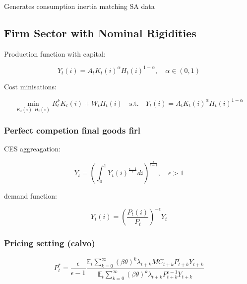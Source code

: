 \documentclass[11pt,preprint]{elsarticle}
\numberwithin{equation}{section}
\numberwithin{figure}{section}
\numberwithin{table}{section}
\begin{document}
Generates consumption inertia matching SA data

\subsection{Firm Sector with Nominal
Rigidities}\label{firm-sector-with-nominal-rigidities}

Production function with capital:

\begin{equation}
Y_t(i) = A_t K_t(i)^{\alpha} H_t(i)^{1-\alpha}, \quad \alpha \in (0,1)
\label{production}
\end{equation}

Cost minisations:

\begin{equation}
\min_{K_t(i), H_t(i)} R_t^k K_t(i) + W_t H_t(i) \quad \text{s.t.} \quad Y_t(i) = A_t K_t(i)^{\alpha} H_t(i)^{1-\alpha}
\end{equation}

\subsubsection{Perfect competion final goods
firl}\label{perfect-competion-final-goods-firl}

CES aggreagation:

\begin{equation}
Y_t = \left( \int_0^1 Y_t(i)^{\frac{\epsilon-1}{\epsilon}} di \right)^{\frac{\epsilon}{\epsilon-1}}, \quad \epsilon > 1
\label{ces_aggregator}
\end{equation}

demand function:

\begin{equation}
Y_t(i) = \left( \frac{P_t(i)}{P_t} \right)^{-\epsilon} Y_t
\label{demand_curve}
\end{equation}

\subsubsection{Pricing setting (calvo)}\label{pricing-setting-calvo}

\begin{equation}
P_t^* = \frac{\epsilon}{\epsilon-1} \frac{
\mathbb{E}_t \sum_{k=0}^{\infty} (\beta\theta)^k \lambda_{t+k} MC_{t+k} P_{t+k}^{\epsilon} Y_{t+k}
}{
\mathbb{E}_t \sum_{k=0}^{\infty} (\beta\theta)^k \lambda_{t+k} P_{t+k}^{\epsilon-1} Y_{t+k}
}
\label{optimal_price}
\end{equation}
\end{document}
